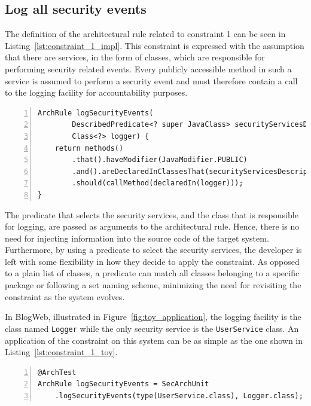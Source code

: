 \subsection{Log all security events}
The definition of the architectural rule related to constraint 1 can be seen in Listing~\ref{lst:constraint_1_impl}. This constraint is expressed with the assumption that there are services, in the form of classes, which are responsible for performing security related events. Every publicly accessible method in such a service is assumed to perform a security event and must therefore contain a call to the logging facility for accountability purposes.

\begin{minipage}{\linewidth}
\begin{lstlisting}[caption={Rule definition for constraint 1.}, captionpos=b, label=lst:constraint_1_impl, numbers=left]
ArchRule logSecurityEvents(
        DescribedPredicate<? super JavaClass> securityServicesDescriptor,
        Class<?> logger) {
    return methods()
        .that().haveModifier(JavaModifier.PUBLIC)
        .and().areDeclaredInClassesThat(securityServicesDescriptor)
        .should(callMethod(declaredIn(logger)));
}
\end{lstlisting}
\end{minipage}

The predicate that selects the security services, and the class that is responsible for logging, are passed as arguments to the architectural rule. Hence, there is no need for injecting information into the source code of the target system. Furthermore, by using a predicate to select the security services, the developer is left with some flexibility in how they decide to apply the constraint. As opposed to a plain list of classes, a predicate can match all classes belonging to a specific package or following a set naming scheme, minimizing the need for revisiting the constraint as the system evolves.

In BlogWeb, illustrated in Figure~\ref{fig:toy_application}, the logging facility is the class named \texttt{Logger} while the only security service is the \texttt{UserService} class. An application of the constraint on this system can be as simple as the one shown in Listing~\ref{lst:constraint_1_toy}.

\begin{minipage}{\linewidth}
\begin{lstlisting}[caption={Application of constraint 1 to BlogWeb.}, captionpos=b, label=lst:constraint_1_toy, numbers=left]
@ArchTest
ArchRule logSecurityEvents = SecArchUnit
    .logSecurityEvents(type(UserService.class), Logger.class);
\end{lstlisting}
\end{minipage}

